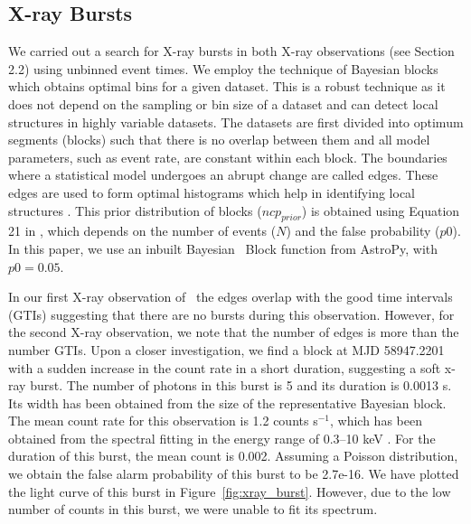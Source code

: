 \documentclass[twocolumn]{emulateapj}
\begin{document}
\subsection{X-ray Bursts}
\label{ssec:xray_bursts}
We carried out a search for X-ray bursts in both X-ray observations (see Section 2.2) 
using unbinned event times. We employ the technique of Bayesian blocks \citep{scargle12} 
which obtains optimal bins for a given dataset. This is a robust technique as it does 
not depend on the sampling or bin size of a dataset and can detect local structures 
in highly variable datasets. The datasets are first divided into optimum segments (blocks) 
such that there is no overlap between them and all model parameters, such as event rate, 
are constant within each block. The boundaries where a statistical model undergoes an 
abrupt change are called edges. These edges are used to form optimal histograms which 
help in identifying local structures \citep{lin13}. This prior distribution of blocks 
($ncp_{prior}$) is obtained using Equation 21 in \cite{scargle12}, which depends on 
the number of events ($N$) and the false probability ($p0$). In this paper, we use 
an inbuilt Bayesian  Block function from AstroPy, with $p0 = 0.05$.

In our first X-ray observation of \jmag\, the edges overlap with the good time intervals 
(GTIs) suggesting that there are no bursts during this observation. However, for the 
second X-ray observation, we note that the number of edges is more than the number GTIs. 
Upon a closer investigation, we find a block at MJD 58947.2201 with a sudden increase 
in the count rate in a short duration, suggesting a soft x-ray burst. The number of 
photons in this burst is 5 and its duration is 0.0013 s. Its width has been obtained 
from the size of the representative Bayesian block. The mean count rate for this 
observation is 1.2 counts s$^{-1}$, which has been obtained from the spectral fitting 
in the energy range of 0.3--10 keV \citep{hu2020}. For the duration of this burst, the 
mean count is 0.002. Assuming a Poisson distribution, we obtain the false alarm 
probability of this burst to be 2.7e-16. We have plotted the light curve of this 
burst in Figure~\ref{fig:xray_burst}. However, due to the low number of counts 
in this burst, we were unable to fit its spectrum.

\end{document}
